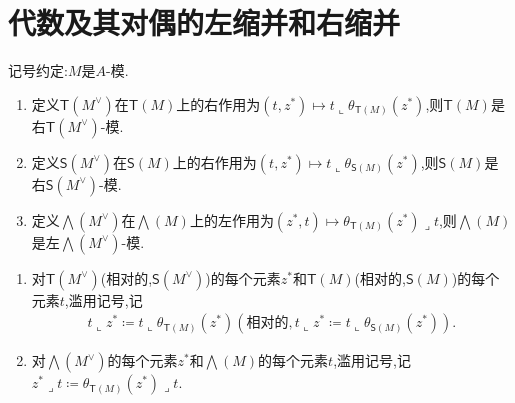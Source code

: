 \section{代数及其对偶的左缩并和右缩并}

记号约定:$M$是$A$-模.

\begin{definition}{}{}
	\begin{enumerate}
		\item 定义$\mathsf{T}\left(M^{\vee}\right)$在$\mathsf{T}\left(M\right)$上的右作用为$\left(t,z^{\ast}\right)\mapsto t\llcorner\theta_{\mathsf{T}\left(M\right)}\left(z^{\ast}\right)$,则$\mathsf{T}\left(M\right)$是右$\mathsf{T}\left(M^{\vee}\right)$-模.
		\item 定义$\mathsf{S}\left(M^{\vee}\right)$在$\mathsf{S}\left(M\right)$上的右作用为$\left(t,z^{\ast}\right)\mapsto t\llcorner\theta_{\mathsf{S}\left(M\right)}\left(z^{\ast}\right)$,则$\mathsf{S}\left(M\right)$是右$\mathsf{S}\left(M^{\vee}\right)$-模.
		\item 定义$\bigwedge\left(M^{\vee}\right)$在$\bigwedge\left(M\right)$上的左作用为$\left(z^{\ast},t\right)\mapsto\theta_{\mathsf{T}\left(M\right)}\left(z^{\ast}\right)\lrcorner t$,则$\bigwedge\left(M\right)$是左$\bigwedge\left(M^{\vee}\right)$-模.
	\end{enumerate}
\end{definition}

\begin{remark}{}{}
	\begin{enumerate}
		\item 对$\mathsf{T}\left(M^{\vee}\right)$(相对的,$\mathsf{S}\left(M^{\vee}\right)$)的每个元素$z^{\ast}$和$\mathsf{T}\left(M\right)$(相对的,$\mathsf{S}\left(M\right)$)的每个元素$t$,滥用记号,记
		\begin{align*}
			t\llcorner z^{\ast}\coloneq t\llcorner\theta_{\mathsf{T}\left(M\right)}\left(z^{\ast}\right)(\text{相对的},t\llcorner z^{\ast}\coloneq t\llcorner\theta_{\mathsf{S}\left(M\right)}\left(z^{\ast}\right)).
		\end{align*}
		\item 对$\bigwedge\left(M^{\vee}\right)$的每个元素$z^{\ast}$和$\bigwedge\left(M\right)$的每个元素$t$,滥用记号,记$z^{\ast}\lrcorner t\coloneq \theta_{\mathsf{T}\left(M\right)}\left(z^{\ast}\right)\lrcorner t$.
	\end{enumerate}
\end{remark}

